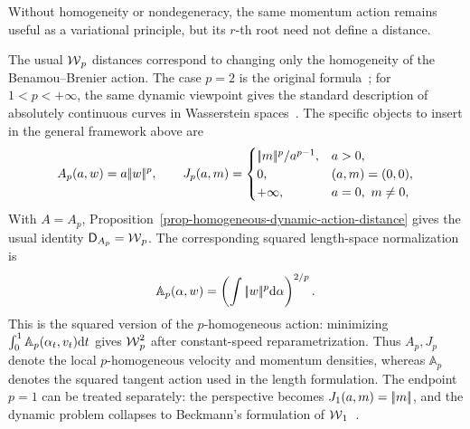 Without homogeneity or nondegeneracy, the same momentum action remains useful as a variational principle, but its \(r\)-th root need not define a distance.

\begin{example}
	The usual $\operatorname{\mathcal{W}}_p$ distances correspond to changing only the homogeneity of the Benamou--Brenier action. The case $p=2$ is the original formula~\cite{benamou2000computational}; for $1<p<+\infty$, the same dynamic viewpoint gives the standard description of absolutely continuous curves in Wasserstein spaces~\cite{ambrosio2006gradient,Villani03,SantambrogioBook}. The specific objects to insert in the general framework above are
	\[
		A_p(a,w)=a|\!| w |\!|^p,
		\qquad
		J_p(a,m)=
		\begin{cases}
			|\!| m |\!|^p/a^{p-1}, & a>0,\\
			0, & (a,m)=(0,0),\\
			+\infty, & a=0,\ m\neq 0,
		\end{cases}
	\]
	With \(A=A_p\), Proposition~\ref{prop-homogeneous-dynamic-action-distance} gives the usual identity \(\mathsf D_{A_p}=\operatorname{\mathcal{W}}_p\). The corresponding squared length-space normalization is
	\[
		\mathbb A_p(\alpha,w)
		=
		\left(\int|\!| w |\!|^p\mathrm{d}\alpha\right)^{2/p}.
	\]
	This is the squared version of the \(p\)-homogeneous action: minimizing \(\int_0^1\mathbb A_p(\alpha_t,v_t)\mathrm{d} t\) gives \(\operatorname{\mathcal{W}}_p^2\) after constant-speed reparametrization. Thus \(A_p,J_p\) denote the local \(p\)-homogeneous velocity and momentum densities, whereas \(\mathbb A_p\) denotes the squared tangent action used in the length formulation. The endpoint $p=1$ can be treated separately: the perspective becomes \(J_1(a,m)=|\!| m |\!|\), and the dynamic problem collapses to Beckmann's formulation of $\operatorname{\mathcal{W}}_1$~\cite{Beckmann52}.
\end{example}

